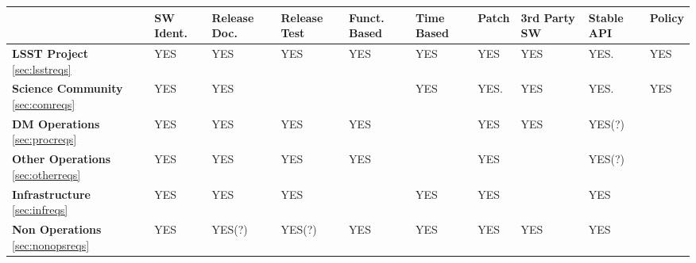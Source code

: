 \setlength\LTleft{-0.4in}
\setlength\LTright{-0.5in}
\begin{longtable}{p{2.4cm}p{1.2cm}p{1.4cm}p{1.4cm}p{1.3cm}p{1.3cm}p{1.3cm}p{1.7cm}p{1.3cm}p{1.3cm}}\hline
&
\textbf{SW Ident.}&\textbf{Release Doc.}&\textbf{Release Test}&\textbf{Funct. Based}&\textbf{Time Based}&\textbf{Patch}&\textbf{3rd Party SW}&\textbf{Stable API} &\textbf{Policy}\\ \hline
\textbf{LSST Project} \ref{sec:lsstreqs}&
YES                     & YES                         & YES                         &  YES                         &  YES                      & YES             & YES                          &  YES.                   & YES   \\ \hline
\textbf{Science Community} \ref{sec:comreqs}&
YES                     & YES                         &                                 &                                   &  YES                     & YES.            & YES                          &  YES.                   & YES   \\ \hline
\textbf{DM Operations} \ref{sec:procreqs}&
YES                     & YES                         & YES                         & YES                           &                              & YES             & YES                          &  YES(?)                &            \\ \hline
\textbf{Other Operations} \ref{sec:otherreqs}&
YES                     & YES                         & YES                         & YES                           &                              & YES             &                                  &  YES(?)                &            \\ \hline
\textbf{Infrastructure} \ref{sec:infreqs}&
YES                     & YES                         & YES                         &                                   &  YES                     & YES             &                                  &  YES                    &            \\ \hline
\textbf{Non Operations} \ref{sec:nonopsreqs}&
YES                     & YES(?)                     & YES(?)                    & YES                           &  YES                     & YES             & YES                          &  YES                    &            \\ \hline
\hline
\end{longtable}
\setlength\LTleft{0in}
\setlength\LTright{0in}


